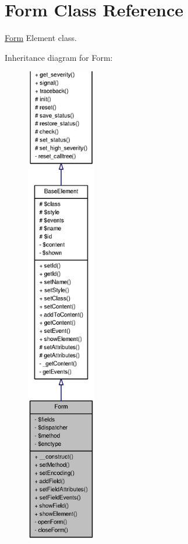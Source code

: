 \section{Form Class Reference}
\label{classForm}


\hyperlink{classForm}{Form} Element class.  




Inheritance diagram for Form:\nopagebreak
\begin{figure}[H]
\begin{center}
\leavevmode
\includegraphics[height=600pt]{classForm__inherit__graph}
\end{center}
\end{figure}


